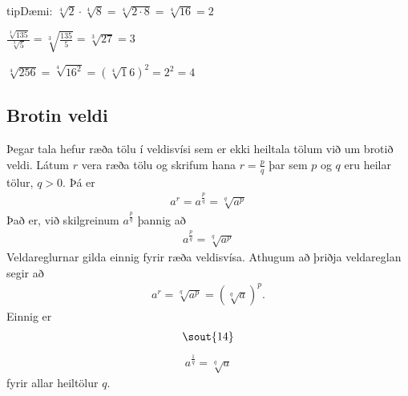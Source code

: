 \documentclass[a4paper,10pt,icelandic]{sphinxmanual}
\begin{document}
\begin{sphinxadmonition}{tip}{Dæmi:}
 \(\sqrt[4]{2} \cdot \sqrt[4]{8}= \sqrt[4]{2 \cdot 8}= \sqrt[4]{16}=2\)

 \(\frac{\sqrt[3]{135}}{\sqrt[3]{5}}=\sqrt[3]{\frac{135}{5}}=\sqrt[3]{27}=3\)

 \(\sqrt[4]{256} = \sqrt[4]{16^2}=\left(\sqrt[4]16\right)^2=2^2=4\)
\end{sphinxadmonition}


\subsection{Brotin veldi}
\label{\detokenize{Kafli01:brotin-veldi}}
Þegar tala hefur ræða tölu í veldisvísi sem er ekki heiltala tölum við um brotið veldi. Látum \(r\) vera ræða tölu og skrifum hana \(r=\frac{p}{q}\) þar sem \(p\) og \(q\) eru heilar tölur, \(q>0\). Þá er
\begin{equation*}
\begin{split}a^r=a^{\frac{p}{q}}=\sqrt[q]{a^p}\end{split}
\end{equation*}
Það er, við skilgreinum \(a^{\frac{p}{q}}\) þannig að
\begin{equation*}
\begin{split}a^{\frac{p}{q}}=\sqrt[q]{a^p}\end{split}
\end{equation*}
Veldareglurnar gilda einnig fyrir ræða veldisvísa. Athugum að þriðja veldareglan segir að
\begin{equation*}
\begin{split}a^r=\sqrt[q]{a^p}=(\sqrt[q]{a})^p.\end{split}
\end{equation*}
Einnig er
\begin{equation*}
\begin{split}\sout{14}\end{split}
\end{equation*}\begin{equation*}
\begin{split}a^{\frac{1}{q}}=\sqrt[q]{a}\end{split}
\end{equation*}
fyrir allar heiltölur \(q\).
\end{document}
